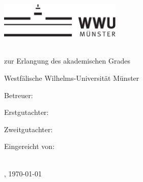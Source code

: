 \thispagestyle{empty}

\begin{center}
    \includegraphics[height=1.7cm]{logos/wwu.pdf}
    \hfill
    \par
    \vspace*{8ex}
    {
        \linespread{0.9}
        \LARGE
        \printtitle
        \par
    }
    \normalsize
    \vspace*{8ex}
    \large
    \textsc{\printtype}\\
    \normalsize
    zur Erlangung des akademischen Grades\\
    \large
    \textsc{\printdegree}
    \par
    \normalsize
    \vspace*{6ex}
    Westfälische Wilhelms-Universität Münster\\
    \printinstitute
\end{center}

\par
\vspace*{6ex}
Betreuer:\\
\large
\textit{\printsupervisor}

\par
\normalsize
\vspace*{2ex}
Erstgutachter:\\
\large
\textit{\printfirstassessor}

\par
\normalsize
\vspace*{2ex}
Zweitgutachter:\\
\large
\textit{\printsecondassessor}

\par
\normalsize
\vspace*{2ex}
Eingereicht von: \\ %
\large
\textit{\printname} \\ %





\par
\normalsize
\vspace*{4ex}
\printcity, \today %
